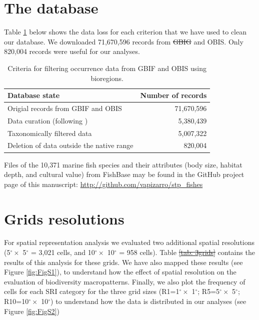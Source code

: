 \documentclass[12pt,authoryear]{elsarticle}
\providecommand{\DIFaddtex}[1]{{\protect\color{blue}\uwave{#1}}} %
\providecommand{\DIFdeltex}[1]{{\protect\color{red}\sout{#1}}}                      %
\providecommand{\DIFaddbegin}{} %
\providecommand{\DIFaddend}{} %
\providecommand{\DIFdelbegin}{} %
\providecommand{\DIFdelend}{} %
\providecommand{\DIFaddbeginFL}{} %
\providecommand{\DIFaddendFL}{} %
\providecommand{\DIFdelbeginFL}{} %
\providecommand{\DIFdelendFL}{} %
\providecommand{\DIFadd}[1]{\texorpdfstring{\DIFaddtex{#1}}{#1}} %
\providecommand{\DIFdel}[1]{\texorpdfstring{\DIFdeltex{#1}}{}} %
\begin{document}
\clearpage
\appendix

\section{The database}
Table \ref{tab:data cleaning} below shows the data loss for each criterion that we have used to clean our database. We downloaded 71,670,596 records from \DIFdelbegin \DIFdel{GBIG }\DIFdelend \DIFaddbegin \DIFadd{GBIF }\DIFaddend and OBIS. Only 820,004 records were useful for our analyses.

\begin{table}[h]
\centering
\DIFdelbeginFL %
\DIFdelendFL \DIFaddbeginFL \begin{tabular}{ l  r }

\DIFaddendFL \textbf{Database state} & \textbf{Number of records}\\ 
  \hline
  \DIFaddbeginFL \hline
  \DIFaddendFL Origial records from GBIF and OBIS & 71,670,596 \\ 
  Data curation (following  \cite{zizka2020}) & 5,380,439\\
  Taxonomically filtered data & 5,007,322\\ 
  Deletion of data outside the native range & 820,004\\ 
  \hline
   \DIFaddbeginFL \hline
\DIFaddendFL \end{tabular}
\caption{Criteria for filtering occurrence data from GBIF and OBIS using bioregions.}
\label{tab:data cleaning}
\end{table}

Files of the 10,371 marine fish species and their attributes (body size, habitat depth, and cultural value) from FishBase may be found in the GitHub project page of this manuscript: \href{https://github.com/vapizarro/stp_fishes}{http://github.com/vapizarro/stp\_fishes}



\section{Grids resolutions}

For spatial representation analysis we evaluated two additional spatial resolutions (5$^\circ \times$ 5$^\circ$ = 3,021 cells, and 10$^\circ \times$ 10$^\circ$ = 958 cells). Table \DIFdelbegin \DIFdel{\ref{tab: 3grids} }\DIFdelend \DIFaddbegin \DIFadd{\ref{tab: percentage} }\DIFaddend contains the results of this analysis for these grids. We have also mapped these results (see Figure \ref{fig:FigS1}), to understand how the effect of spatial resolution on the evaluation of biodiversity macropatterns. Finally, we also plot the frequency of cells for each SRI category for the three grid sizes (R1=1$^\circ \times$ 1$^\circ$; R5=5$^\circ \times$ 5$^\circ$; R10=10$^\circ \times$ 10$^\circ$) to understand how the data is distributed in our analyses (see Figure \ref{fig:FigS2})
\end{document}
